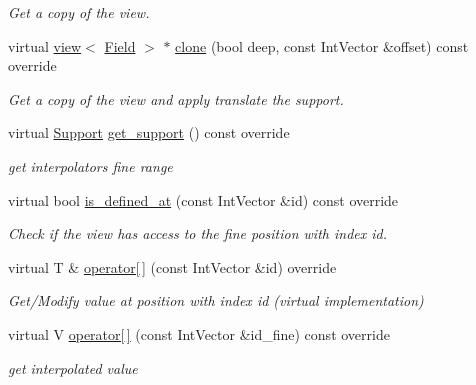 \begin{DoxyCompactItemize}
\begin{DoxyCompactList}\small\item\em Get a copy of the view. \end{DoxyCompactList}\item 
virtual \hyperlink{classUintah_1_1PhaseField_1_1detail_1_1view}{view}$<$ \hyperlink{structUintah_1_1PhaseField_1_1ScalarField}{Field} $>$ $\ast$ \hyperlink{classUintah_1_1PhaseField_1_1detail_1_1amr__interpolator_3_01ScalarField_3_01T_01_4_00_01Problem64f2458f98b03e27672a091eecc4b696_a890e72b7dfe89f2a0f95bb76d5f7638b}{clone} (bool deep, const Int\+Vector \&offset) const override
\begin{DoxyCompactList}\small\item\em Get a copy of the view and apply translate the support. \end{DoxyCompactList}\item 
virtual \hyperlink{classUintah_1_1PhaseField_1_1Support}{Support} \hyperlink{classUintah_1_1PhaseField_1_1detail_1_1amr__interpolator_3_01ScalarField_3_01T_01_4_00_01Problem64f2458f98b03e27672a091eecc4b696_a9b8a209da971b010bbe33864781d31b2}{get\+\_\+support} () const override
\begin{DoxyCompactList}\small\item\em get interpolator\textquotesingle{}s fine range \end{DoxyCompactList}\item 
virtual bool \hyperlink{classUintah_1_1PhaseField_1_1detail_1_1amr__interpolator_3_01ScalarField_3_01T_01_4_00_01Problem64f2458f98b03e27672a091eecc4b696_a717ca596094560642261d7bec44c6695}{is\+\_\+defined\+\_\+at} (const Int\+Vector \&id) const override
\begin{DoxyCompactList}\small\item\em Check if the view has access to the fine position with index id. \end{DoxyCompactList}\item 
virtual T \& \hyperlink{classUintah_1_1PhaseField_1_1detail_1_1amr__interpolator_3_01ScalarField_3_01T_01_4_00_01Problem64f2458f98b03e27672a091eecc4b696_ac91d5f95be69ce381a6458f38478ba74}{operator\mbox{[}$\,$\mbox{]}} (const Int\+Vector \&id) override
\begin{DoxyCompactList}\small\item\em Get/\+Modify value at position with index id (virtual implementation) \end{DoxyCompactList}\item 
virtual V \hyperlink{classUintah_1_1PhaseField_1_1detail_1_1amr__interpolator_3_01ScalarField_3_01T_01_4_00_01Problem64f2458f98b03e27672a091eecc4b696_aafa653b8bf8b3fae50db0042f5bbbcfc}{operator\mbox{[}$\,$\mbox{]}} (const Int\+Vector \&id\+\_\+fine) const override
\begin{DoxyCompactList}\small\item\em get interpolated value \end{DoxyCompactList}\end{DoxyCompactItemize}
